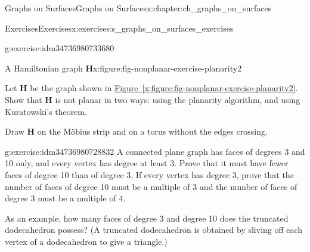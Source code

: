 \documentclass[oneside,10pt,]{book}
\newcommand{\xreffont}{\relax}
\numberwithin{equation}{section}
\newcommand{\bfH}{\mathbf{H}}
\begin{document}
\begin{chapterptx}{Graphs on Surfaces}{}{Graphs on Surfaces}{}{}{x:chapter:ch_graphs_on_surfaces}
\begin{exercises-section}{Exercises}{}{Exercises}{}{}{x:exercises:s_graphs_on_surfaces_exercises}
\begin{divisionexercise}{4}{}{}{g:exercise:idm34736980733680}
\begin{figureptx}{A Hamiltonian graph \(\bfH\)}{x:figure:fig-nonplanar-exercise-planarity2}{}
\begin{image}{0.15}{0.7}{0.15}
{
}%
\end{image}%
\tcblower
\end{figureptx}%
Let \(\bfH\) be the graph shown in \hyperref[x:figure:fig-nonplanar-exercise-planarity2]{Figure~{\xreffont\ref{x:figure:fig-nonplanar-exercise-planarity2}}}.  Show that \(\bfH\) is not planar in two ways: using the planarity algorithm, and using Kuratowski's theorem.%
\par
Draw \(\bfH\) on the Möbius strip and on a torus without the edges crossing.%
\end{divisionexercise}%
\begin{divisionexercise}{5}{}{}{g:exercise:idm34736980728832}%
A connected plane graph has faces of degrees 3 and 10 only, and every vertex has degree at least 3.  Prove that it must have fewer faces of degree 10 than of degree 3.  If every vertex has degree 3, prove that the number of faces of degree 10 must be a multiple of 3 and the number of faces of degree 3 must be a multiple of 4.%
\par
As an example, how many faces of degree 3 and degree 10 does the truncated dodecahedron possess?  (A truncated dodecahedron is obtained by sliving off each vertex of a dodecahedron to give a triangle.)%
\end{divisionexercise}%
\end{exercises-section}
\end{chapterptx}
%
%
\typeout{************************************************}
\typeout{************************************************}
%
\end{document}
